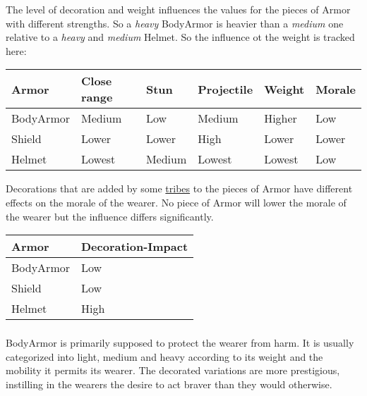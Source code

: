 The level of decoration and weight influences the values for the pieces of
\gls{Armor} with different strengths. So a \emph{heavy} \gls{BodyArmor} is
heavier than a \emph{medium} one relative to a \emph{heavy} and \emph{medium}
\gls{Helmet}. So the influence ot the weight is tracked here:

\begin{longtable}{llllll}
	\toprule
	\Gls*{Armor}
	 & Close range & Stun   & Projectile & Weight & Morale \\
	\midrule
	\Gls{BodyArmor}
	 & Medium      & Low    & Medium     & Higher & Low    \\
	\Gls{Shield}
	 & Lower       & Lower  & High       & Lower  & Lower  \\
	\Gls{Helmet}
	 & Lowest      & Medium & Lowest     & Lowest & Low    \\
	\bottomrule
\end{longtable}

Decorations that are added by some \hyperref[ch:Tribes]{tribes} to the pieces
of \gls*{Armor} have different effects on the morale of the wearer. No piece of
\gls*{Armor} will lower the morale of the wearer but the influence differs
significantly.

\begin{longtable}{ll}
	\toprule
	\Gls*{Armor}    & Decoration-Impact \\
	\midrule
	\Gls{BodyArmor} & Low               \\
	\Gls{Shield}    & Low               \\
	\Gls{Helmet}    & High              \\
	\bottomrule
\end{longtable}

\subsubsection{}\label{ch:Goods:Armory:Armor:BodyArmor}

\Gls*{BodyArmor} is primarily supposed to protect the wearer from harm. It is usually
categorized into light, medium and heavy according to its weight and the
mobility it permits its wearer. The decorated variations are more prestigious,
instilling in the wearers the desire to act braver than they would otherwise.

\subsubsection{}\label{ch:Goods:Armory:Armor:Shield}

